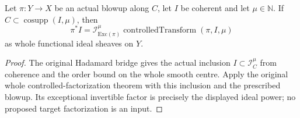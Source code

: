 \begin{lemma}
\label{pub:hadamard-whole-controlled-factor}
\notready
Let $\pi:Y\to X$ be an actual blowup along $C$, let $I$ be coherent and let
$\mu\in\mathbb N$. If $C\subset\operatorname{cosupp}(I,\mu)$, then
\[
 \pi^*I=\mathcal I_{\mathrm{Exc}(\pi)}^{\mu}
          \operatorname{controlledTransform}(\pi,I,\mu)
\]
as whole functional ideal sheaves on $Y$.
\end{lemma}
\begin{proof}
The original Hadamard bridge gives the actual inclusion
$I\subset\mathcal I_C^\mu$ from coherence and the order bound on the whole
smooth centre. Apply the original whole controlled-factorization theorem with
this inclusion and the prescribed blowup. Its exceptional invertible factor
is precisely the displayed ideal power; no proposed target factorization is
an input.
\end{proof}
